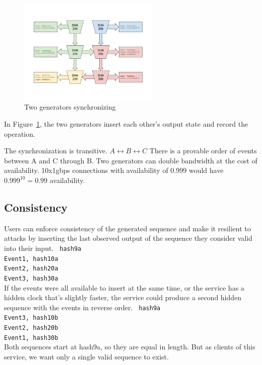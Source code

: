 \documentclass[12pt]{article}
\begin{document}
\begin{figure}
  \begin{center}
    \centering
    \includegraphics[width=0.6\textwidth]{figures/fig_5.png}
    \caption[Fig 5]{Two generators synchronizing\label{fig:poh_scale}}
  \end{center}
  \end{figure}

In Figure~\ref{fig:poh_scale}, the two generators insert each other’s output state and record the operation.  

The synchronization is transitive.  \(A \leftrightarrow B \leftrightarrow C\)  There is a provable order of events between A and C through B.  Two generators can double bandwidth at the cost of availability.  10x1gbps connections with availability of 0.999 would have \(0.999^{10} = 0.99 \) availability.
\subsection{Consistency}
Users can enforce consistency of the generated sequence and make it resilient to attacks by inserting the last observed output of the sequence they consider valid into their input.
\texttt{
hash9a\\
Event1, hash10a\\
Event2, hash20a\\
Event3, hash30a\\
}
If the events were all available to insert at the same time, or the service has a hidden clock that's slightly faster, the service could produce a second hidden sequence with the events in reverse order.
\texttt{
hash9a\\
Event3, hash10b\\
Event2, hash20b\\
Event1, hash30b\\
}
Both sequences start at hash9a, so they are equal in length.  But as clients of this service, we want only a single valid sequence to exist. 
\end{document}
